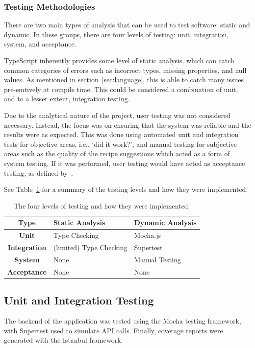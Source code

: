 \subsubsection{Testing Methodologies}

There are two main types of analysis that can be used to test software: static and dynamic. In these groups, there are
four levels of testing: unit, integration, system, and acceptance.~\cite{luo_software_2001}

TypeScript inherently provides some level of static analysis, which can catch common categories of errors such as
incorrect types, missing properties, and null values. As mentioned in section~\ref{sec:language}, this is able to
catch many issues pre-emtively at compile time. This could be considered a combination of unit, and to a lesser extent,
integration testing.

Due to the analytical nature of the project, user testing was not considered necessary. Instead, the focus was on ensuring
that the system was reliable and the results were as expected. This was done using automated unit and integration tests for
objective areas, i.e., \enquote*{did it work?}, and manual testing for subjective areas such as the quality of the recipe
suggestions which acted as a form of system testing. If it was performed, user testing would have acted as acceptance testing,
as defined by~\cite{luo_software_2001}.

See Table~\ref{tab:test_types} for a summary of the testing levels and how they were implemented.

\begin{table}[hp]
    \centering
    \caption{\label{tab:test_types}The four levels of testing and how they were implemented.}
    \begin{tabular}{cll}\toprule
        \textbf{Type} & \textbf{Static Analysis} & \textbf{Dynamic Analysis} \\\midrule
        \textbf{Unit} & Type Checking & Mocha.js \\
        \textbf{Integration} & (limited) Type Checking & Supertest \\
        \textbf{System} & None & Manual Testing \\
        \textbf{Acceptance} & None & None \\
        \bottomrule
    \end{tabular}
\end{table}

\subsection{Unit and Integration Testing}
The backend of the application was tested using the Mocha testing framework, with Supertest
used to simulate API calls. Finally, coverage reports were generated with the Istanbul framework.

